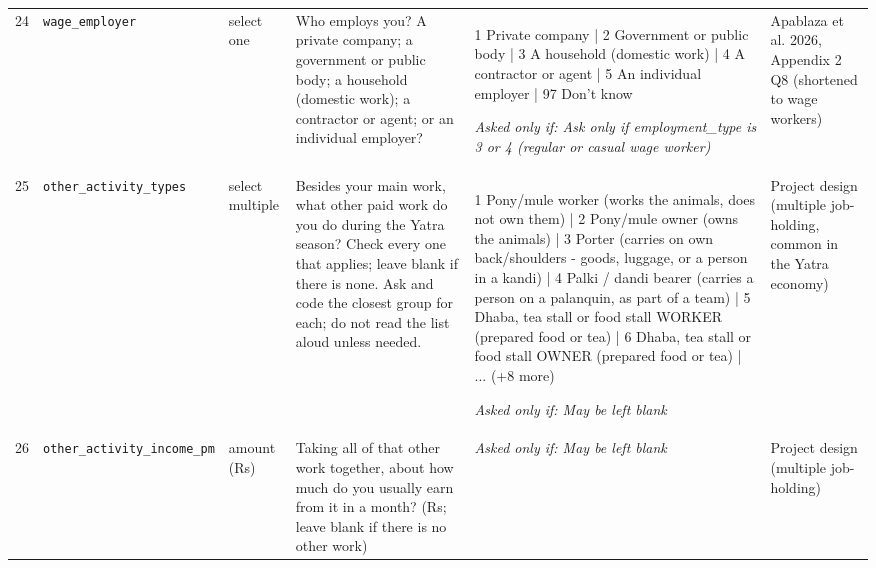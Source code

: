 \documentclass[9pt,a4paper,landscape]{article}
\begin{document}
\begin{longtable}{@{}p{0.5cm}p{3.3cm}p{1.7cm}p{7.3cm}p{5.6cm}p{5.4cm}@{}}
\footnotesize 24 & \footnotesize\texttt{wage\_employer} & \scriptsize select one & \footnotesize Who employs you? A private company; a government or public body; a household (domestic work); a contractor or agent; or an individual employer?\par\vspace{1pt}{\footnotesize\color{hdr}{\hifont आपको काम पर कौन रखता है? कोई निजी कंपनी; सरकारी या सार्वजनिक विभाग; कोई घर (घरेलू काम); ठेकेदार या एजेंट; या कोई व्यक्ति जो सीधे पैसे देता है?}} & \scriptsize 1 Private company | 2 Government or public body | 3 A household (domestic work) | 4 A contractor or agent | 5 An individual employer | 97 Don't know\par\vspace{1pt}\textit{Asked only if: Ask only if employment\_type is 3 or 4 (regular or casual wage worker)} & \scriptsize Apablaza et al. 2026, Appendix 2 Q8 (shortened to wage workers)\\
\footnotesize 25 & \footnotesize\texttt{other\_activity\_types} & \scriptsize select multiple & \footnotesize Besides your main work, what other paid work do you do during the Yatra season? Check every one that applies; leave blank if there is none. Ask and code the closest group for each; do not read the list aloud unless needed.\par\vspace{1pt}{\footnotesize\color{hdr}{\hifont वे कौन-कौन से काम हैं? जो-जो लागू हो, सब बताइए।}} & \scriptsize 1 Pony/mule worker (works the animals, does not own them) | 2 Pony/mule owner (owns the animals) | 3 Porter (carries on own back/shoulders - goods, luggage, or a person in a kandi) | 4 Palki / dandi bearer (carries a person on a palanquin, as part of a team) | 5 Dhaba, tea stall or food stall WORKER (prepared food or tea) | 6 Dhaba, tea stall or food stall OWNER (prepared food or tea) | ... (+8 more)\par\vspace{1pt}\textit{Asked only if: May be left blank} & \scriptsize Project design (multiple job-holding, common in the Yatra economy)\\
\footnotesize 26 & \footnotesize\texttt{other\_activity\_income\_pm} & \scriptsize amount (Rs) & \footnotesize Taking all of that other work together, about how much do you usually earn from it in a month? (Rs; leave blank if there is no other work)\par\vspace{1pt}{\footnotesize\color{hdr}{\hifont वह सारा दूसरा काम मिलाकर, महीने में लगभग कितना कमा लेते हैं? (रुपये)}} & \scriptsize \textit{Asked only if: May be left blank} & \scriptsize Project design (multiple job-holding)\\

\end{longtable}
\end{document}
